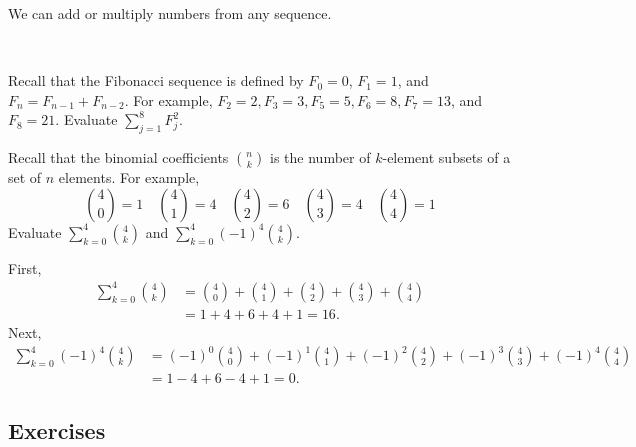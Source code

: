 We can add or multiply numbers from any sequence.  

\begin{exam}
\label{exam_sum_fib_binom}
~
    \begin{apart}
        \item Recall that the Fibonacci sequence is defined by $F_0=0$, $F_1=1$, and $F_n=F_{n-1}+F_{n-2}$.  For example, $F_2=2, F_3=3, F_5=5, F_6=8, F_7=13$, and $F_8=21$.  Evaluate $\displaystyle \sum _{j=1}^8F_{j}^2$.
            \begin{soln}
                
            \end{soln}
        \item Recall that the binomial coefficients $\binom{n}{k}$ is the number of $k$-element subsets of a set of $n$ elements.  For example, 
            $$\binom{4}{0} = 1 \quad 
            \binom{4}{1} = 4 \quad
            \binom{4}{2} = 6 \quad
            \binom{4}{3} = 4 \quad
            \binom{4}{4} = 1$$
        Evaluate $\displaystyle \sum_{k=0}^4 \binom{4}{k}$ and $\displaystyle \sum_{k=0}^4 (-1)^4\binom{4}{k}$.
            \begin{soln}
                First, 
                    \begin{align*}
                        \sum_{k=0}^4 \binom{4}{k}
                        & = \binom{4}{0} + \binom{4}{1} + \binom{4}{2} + \binom{4}{3} + \binom{4}{4} \\
                        & = 1+4+6+4+1=16.
                    \end{align*}
                Next, 
                    \begin{align*}
                        \sum_{k=0}^4 (-1)^4\binom{4}{k}
                        & = (-1)^0\binom{4}{0} + (-1)^1\binom{4}{1} + (-1)^2\binom{4}{2} + (-1)^3\binom{4}{3} + (-1)^4\binom{4}{4} \\
                        & = 1-4+6-4+1=0.
                    \end{align*}
            \end{soln}
    \end{apart}
\end{exam}


\subsection{Exercises} 

